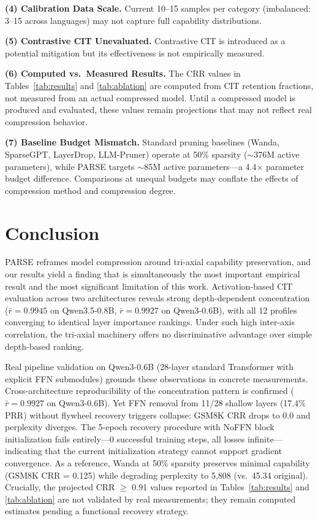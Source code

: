 \documentclass[twocolumn]{article}
\begin{document}
\textbf{(4) Calibration Data Scale.}
Current 10--15 samples per category (imbalanced: 3--15 across languages) may not capture full capability distributions.

\textbf{(5) Contrastive CIT Unevaluated.}
Contrastive CIT is introduced as a potential mitigation but its effectiveness is not empirically measured.

\textbf{(6) Computed vs.\ Measured Results.}
The CRR values in Tables~\ref{tab:results} and \ref{tab:ablation} are computed from CIT retention fractions, not measured from an actual compressed model. Until a compressed model is produced and evaluated, these values remain projections that may not reflect real compression behavior.

\textbf{(7) Baseline Budget Mismatch.}
Standard pruning baselines (Wanda, SparseGPT, LayerDrop, LLM-Pruner) operate at 50\% sparsity ($\sim$376M active parameters), while PARSE targets $\sim$85M active parameters---a 4.4$\times$ parameter budget difference. Comparisons at unequal budgets may conflate the effects of compression method and compression degree.

\section{Conclusion}

PARSE reframes model compression around tri-axial capability preservation, and our results yield a finding that is simultaneously the most important empirical result and the most significant limitation of this work. Activation-based CIT evaluation across two architectures reveals strong depth-dependent concentration ($\bar{r} = 0.9945$ on Qwen3.5-0.8B, $\bar{r} = 0.9927$ on Qwen3-0.6B), with all 12 profiles converging to identical layer importance rankings. Under such high inter-axis correlation, the tri-axial machinery offers no discriminative advantage over simple depth-based ranking.

Real pipeline validation on Qwen3-0.6B (28-layer standard Transformer with explicit FFN submodules) grounds these observations in concrete measurements. Cross-architecture reproducibility of the concentration pattern is confirmed ($\bar{r} = 0.9927$ on Qwen3-0.6B). Yet FFN removal from 11/28 shallow layers (17.4\% PRR) without flywheel recovery triggers collapse: GSM8K CRR drops to 0.0 and perplexity diverges. The 5-epoch recovery procedure with NoFFN block initialization fails entirely---0 successful training steps, all losses infinite---indicating that the current initialization strategy cannot support gradient convergence. As a reference, Wanda at 50\% sparsity preserves minimal capability (GSM8K CRR = 0.125) while degrading perplexity to 5,808 (vs.\ 45.34 original). Crucially, the projected CRR $\geq$ 0.91 values reported in Tables~\ref{tab:results} and \ref{tab:ablation} are not validated by real measurements; they remain computed estimates pending a functional recovery strategy.
\end{document}
